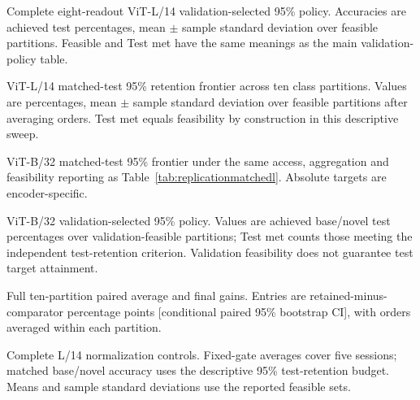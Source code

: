 \documentclass[preprint,review,12pt]{elsarticle}
\begin{document}
\begin{table}[htbp]
\centering
\caption{Complete eight-readout ViT-L/14 validation-selected 95\% policy. Accuracies are achieved test percentages, mean $\pm$ sample standard deviation over feasible partitions. Feasible and Test met have the same meanings as the main validation-policy table.}
\label{tab:replicationvalidationlall}
\resizebox{\linewidth}{!}{}
\end{table}
\begin{table}[htbp]
\centering
\caption{ViT-L/14 matched-test 95\% retention frontier across ten class partitions. Values are percentages, mean $\pm$ sample standard deviation over feasible partitions after averaging orders. Test met equals feasibility by construction in this descriptive sweep.}
\label{tab:replicationmatchedl}
\resizebox{\linewidth}{!}{}
\end{table}
\begin{table}[htbp]
\centering
\caption{ViT-B/32 matched-test 95\% frontier under the same access, aggregation and feasibility reporting as Table~\ref{tab:replicationmatchedl}. Absolute targets are encoder-specific.}
\label{tab:replicationmatchedb}
\resizebox{\linewidth}{!}{}
\end{table}
\begin{table}[htbp]
\centering
\caption{ViT-B/32 validation-selected 95\% policy. Values are achieved base/novel test percentages over validation-feasible partitions; Test met counts those meeting the independent test-retention criterion. Validation feasibility does not guarantee test target attainment.}
\label{tab:replicationvalidationb}
\resizebox{\linewidth}{!}{}
\end{table}

\begin{table}[htbp]
\centering
\caption{Full ten-partition paired average and final gains. Entries are retained-minus-comparator percentage points [conditional paired 95\% bootstrap CI], with orders averaged within each partition.}
\resizebox{\linewidth}{!}{}
\end{table}
\begin{table}[htbp]
\centering
\caption{Complete L/14 normalization controls. Fixed-gate averages cover five sessions; matched base/novel accuracy uses the descriptive 95\% test-retention budget. Means and sample standard deviations use the reported feasible sets.}
\resizebox{\linewidth}{!}{}
\end{table}
\end{document}
